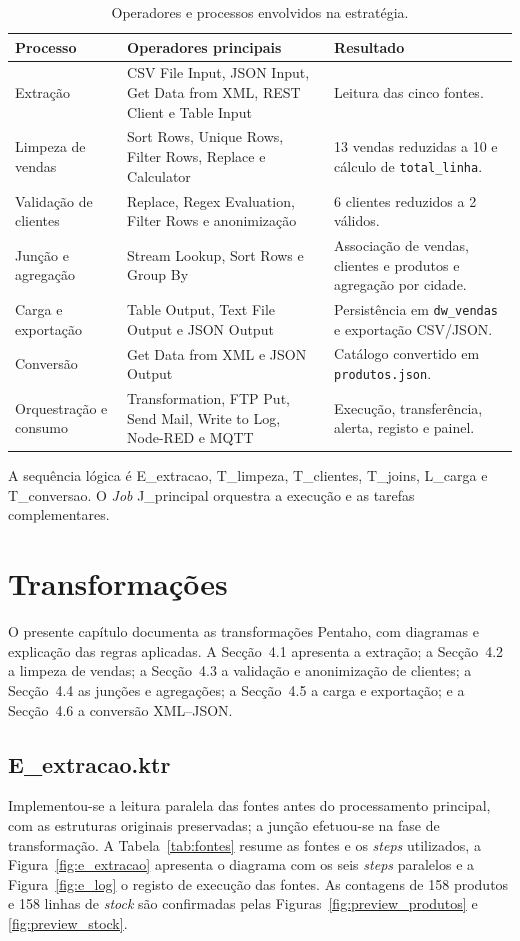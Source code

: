 \documentclass[11pt,a4paper]{article}
\begin{document}
\begin{table}[H]
\centering
\small
\begin{tabular}{|p{2.6cm}|p{4.6cm}|p{4.6cm}|}
\hline
Processo & Operadores principais & Resultado \\ \hline
Extração & CSV File Input, JSON Input, Get Data from XML, REST Client e Table Input & Leitura das cinco fontes. \\ \hline
Limpeza de vendas & Sort Rows, Unique Rows, Filter Rows, Replace e Calculator & 13 vendas reduzidas a 10 e cálculo de \texttt{total\_linha}. \\ \hline
Validação de clientes & Replace, Regex Evaluation, Filter Rows e anonimização & 6 clientes reduzidos a 2 válidos. \\ \hline
Junção e agregação & Stream Lookup, Sort Rows e Group By & Associação de vendas, clientes e produtos e agregação por cidade. \\ \hline
Carga e exportação & Table Output, Text File Output e JSON Output & Persistência em \texttt{dw\_vendas} e exportação CSV/JSON. \\ \hline
Conversão & Get Data from XML e JSON Output & Catálogo convertido em \texttt{produtos.json}. \\ \hline
Orquestração e consumo & Transformation, FTP Put, Send Mail, Write to Log, Node-RED e MQTT & Execução, transferência, alerta, registo e painel. \\ \hline
\end{tabular}
\caption{Operadores e processos envolvidos na estratégia.}
\label{tab:operadores}
\end{table}

A sequência lógica é E\_extracao, T\_limpeza, T\_clientes, T\_joins, L\_carga e T\_conversao. O \textit{Job} J\_principal orquestra a execução e as tarefas complementares.

\section{Transformações}
O presente capítulo documenta as transformações Pentaho, com diagramas e explicação das regras aplicadas. A Secção~4.1 apresenta a extração; a Secção~4.2 a limpeza de vendas; a Secção~4.3 a validação e anonimização de clientes; a Secção~4.4 as junções e agregações; a Secção~4.5 a carga e exportação; e a Secção~4.6 a conversão XML--JSON.

\subsection{E\_extracao.ktr}
Implementou-se a leitura paralela das fontes antes do processamento principal, com as estruturas originais preservadas; a junção efetuou-se na fase de transformação. A Tabela~\ref{tab:fontes} resume as fontes e os \textit{steps} utilizados, a Figura~\ref{fig:e_extracao} apresenta o diagrama com os seis \textit{steps} paralelos e a Figura~\ref{fig:e_log} o registo de execução das fontes. As contagens de 158 produtos e 158 linhas de \textit{stock} são confirmadas pelas Figuras~\ref{fig:preview_produtos} e \ref{fig:preview_stock}.
\end{document}

